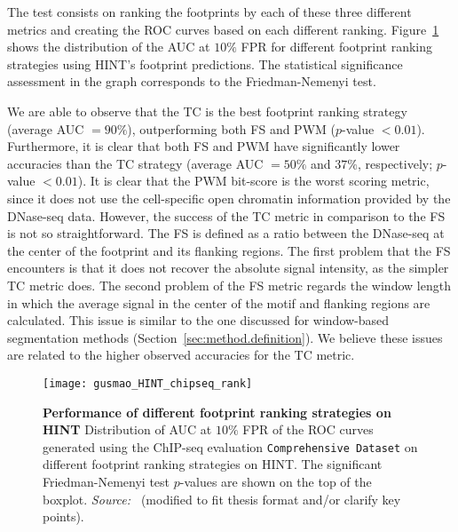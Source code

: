 The test consists on ranking the footprints by each of these three different metrics and creating the ROC curves based on each different ranking. Figure~\ref{fig:gusmao_HINT_chipseq_rank} shows the distribution of the AUC at $10\%$ FPR for different footprint ranking strategies using HINT's footprint predictions. The statistical significance assessment in the graph corresponds to the Friedman-Nemenyi test.

We are able to observe that the TC is the best footprint ranking strategy (average AUC $= 90\%$), outperforming both FS and PWM ($p$-value $< 0.01$). Furthermore, it is clear that both FS and PWM have significantly lower accuracies than the TC strategy (average AUC $= 50\%$ and $37\%$, respectively; $p$-value $< 0.01$). It is clear that the PWM bit-score is the worst scoring metric, since it does not use the cell-specific open chromatin information provided by the DNase-seq data. However, the success of the TC metric in comparison to the FS is not so straightforward. The FS is defined as a ratio between the DNase-seq at the center of the footprint and its flanking regions. The first problem that the FS encounters is that it does not recover the absolute signal intensity, as the simpler TC metric does. The second problem of the FS metric regards the window length in which the average signal in the center of the motif and flanking regions are calculated. This issue is similar to the one discussed for window-based segmentation methods (Section~\ref{sec:method.definition}). We believe these issues are related to the higher observed accuracies for the TC metric.

\begin{figure}[h!]
\centering
\texttt{[image: gusmao\_HINT\_chipseq\_rank]}
\caption[Performance of different footprint ranking strategies on HINT]{\textbf{Performance of different footprint ranking strategies on HINT} Distribution of AUC at $10\%$ FPR of the ROC curves generated using the ChIP-seq evaluation {\tt Comprehensive Dataset} on different footprint ranking strategies on HINT. The significant Friedman-Nemenyi test $p$-values are shown on the top of the boxplot. \emph{Source:~\cite{gusmao2016}} (modified to fit thesis format and/or clarify key points).}
\label{fig:gusmao_HINT_chipseq_rank}
\end{figure}

